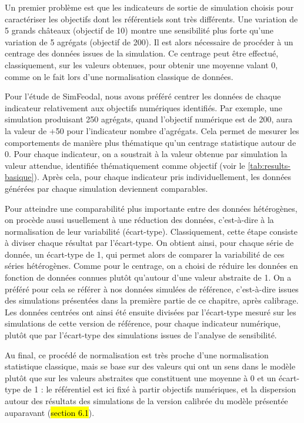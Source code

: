 Un premier problème est que les indicateurs de sortie de simulation choisis pour caractériser les objectifs dont les référentiels sont très différents.
Une variation de 5 grands châteaux (objectif de 10) montre une sensibilité plus forte qu'une variation de 5 agrégats (objectif de 200).
Il est alors nécessaire de procéder à un \og centrage \fg{} des données issues de la simulation.
Ce centrage peut être effectué, classiquement, sur les valeurs obtenues, pour obtenir une moyenne valant 0, comme on le fait lors d'une normalisation classique de données.

Pour l'étude de SimFeodal, nous avons préféré centrer les données de chaque indicateur relativement aux objectifs numériques identifiés.
Par exemple, une simulation produisant 250 agrégats, quand l'objectif numérique est de 200, aura la valeur de +50 pour l'indicateur \og nombre d'agrégats\fg{}.
Cela permet de mesurer les comportements de manière plus thématique qu'un centrage statistique autour de 0.
Pour chaque indicateur, on a soustrait à la valeur obtenue par simulation la \og valeur attendue\fg{}, identifiée thématiquement comme objectif (voir le \cref{tab:results-basique}).
Après cela, pour chaque indicateur pris individuellement, les données générées par chaque simulation deviennent comparables.

Pour atteindre une comparabilité plus importante entre des données hétérogènes, on procède aussi usuellement à une \og réduction\fg{} des données, c'est-à-dire à la normalisation de leur variabilité (écart-type).
Classiquement, cette étape consiste à diviser chaque résultat par l'écart-type.
On obtient ainsi, pour chaque série de donnée, un écart-type de 1, qui permet alors de comparer la variabilité de ces séries hétérogènes.
Comme pour le centrage, on a choisi de réduire les données en fonction de données connues plutôt qu'autour d'une valeur abstraite de 1.
On a préféré pour cela se référer à nos données simulées de référence, c'est-à-dire issues des simulations présentées dans la première partie de ce chapitre, après calibrage.
Les données centrées ont ainsi été ensuite divisées par l'écart-type mesuré sur les simulations de cette version de référence, pour chaque indicateur numérique, plutôt que par l'écart-type des simulations issues de l'analyse de sensibilité.

Au final, ce procédé de normalisation est très proche d'une normalisation statistique classique, mais se base sur des valeurs qui ont un sens dans le modèle plutôt que sur les valeurs \og abstraites\fg{} que constituent une moyenne à 0 et un écart-type de 1 : le référentiel est ici fixé à partir objectifs numériques, et la dispersion autour des résultats des simulations de la version calibrée du modèle présentée auparavant (\hl{section 6.1}).

